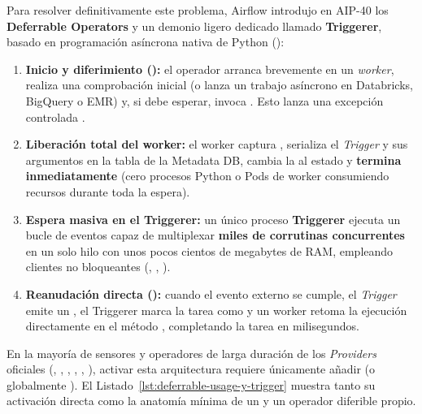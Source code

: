 Para resolver definitivamente este problema, Airflow introdujo en AIP-40 los \textbf{Deferrable Operators} y un demonio ligero dedicado llamado \textbf{Triggerer}, basado en programación asíncrona nativa de Python ():

\begin{enumerate}
  \item \textbf{Inicio y diferimiento ():} el operador arranca brevemente en un \textit{worker}, realiza una comprobación inicial (o lanza un trabajo asíncrono en Databricks, BigQuery o EMR) y, si debe esperar, invoca . Esto lanza una excepción controlada .
  \item \textbf{Liberación total del worker:} el worker captura , serializa el \textit{Trigger} y sus argumentos en la tabla  de la Metadata DB, cambia la  al estado  y \textbf{termina inmediatamente} (cero procesos Python o Pods de worker consumiendo recursos durante toda la espera).
  \item \textbf{Espera masiva en el Triggerer:} un único proceso \textbf{Triggerer} ejecuta un bucle de eventos  capaz de multiplexar \textbf{miles de corrutinas  concurrentes} en un solo hilo con unos pocos cientos de megabytes de RAM, empleando clientes no bloqueantes (, , ).
  \item \textbf{Reanudación directa ():} cuando el evento externo se cumple, el \textit{Trigger} emite un , el Triggerer marca la tarea como  y un worker retoma la ejecución directamente en el método , completando la tarea en milisegundos.
\end{enumerate}

En la mayoría de sensores y operadores de larga duración de los \textit{Providers} oficiales (, , , , , ), activar esta arquitectura requiere únicamente añadir  (o globalmente ). El Listado~\ref{lst:deferrable-usage-y-trigger} muestra tanto su activación directa como la anatomía mínima de un  y un operador diferible propio.

